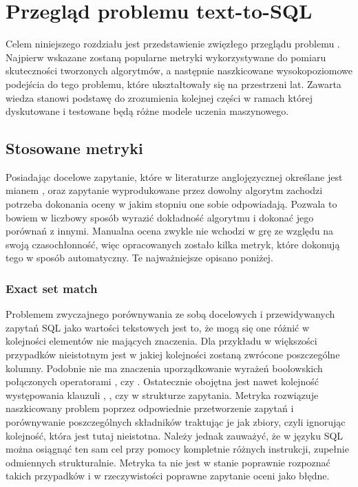 \chapter{Przegląd problemu text-to-SQL}
Celem niniejszego rozdziału jest przedstawienie zwięzłego przeglądu problemu . Najpierw wskazane zostaną popularne metryki wykorzystywane do pomiaru skuteczności tworzonych algorytmów, a następnie naszkicowane wysokopoziomowe podejścia do tego problemu, które ukształtowały się na przestrzeni lat. Zawarta wiedza stanowi podstawę do zrozumienia kolejnej części w ramach której dyskutowane i testowane będą różne modele uczenia maszynowego. 

\section{Stosowane metryki}
Posiadając docelowe zapytanie, które w literaturze anglojęzycznej określane jest mianem , oraz zapytanie wyprodukowane przez dowolny algorytm zachodzi potrzeba dokonania oceny w jakim stopniu one sobie odpowiadają. Pozwala to bowiem w liczbowy sposób wyrazić dokładność algorytmu i dokonać jego porównań z innymi. Manualna ocena zwykle nie wchodzi w grę ze względu na swoją czasochłonność, więc opracowanych zostało kilka metryk, które dokonują tego w sposób automatyczny. Te najważniejsze opisano poniżej.

\subsection{Exact set match}
Problemem zwyczajnego porównywania ze sobą docelowych i przewidywanych zapytań SQL jako wartości tekstowych jest to, że mogą się one różnić w kolejności elementów nie mających znaczenia. Dla przykładu w większości przypadków nieistotnym jest w jakiej kolejności zostaną zwrócone poszczególne kolumny. Podobnie nie ma znaczenia uporządkowanie wyrażeń boolowskich połączonych operatorami , czy . Ostatecznie obojętna jest nawet kolejność występowania klauzuli , , czy  w strukturze zapytania. Metryka  rozwiązuje naszkicowany problem poprzez odpowiednie przetworzenie zapytań i porównywanie poszczególnych składników traktując je jak zbiory, czyli ignorując kolejność, która jest tutaj nieistotna. Należy jednak zauważyć, że w języku SQL można osiągnąć ten sam cel przy pomocy kompletnie różnych instrukcji, zupełnie odmiennych strukturalnie. Metryka ta nie jest w stanie poprawnie rozpoznać takich przypadków i w rzeczywistości poprawne zapytanie oceni jako błędne.

